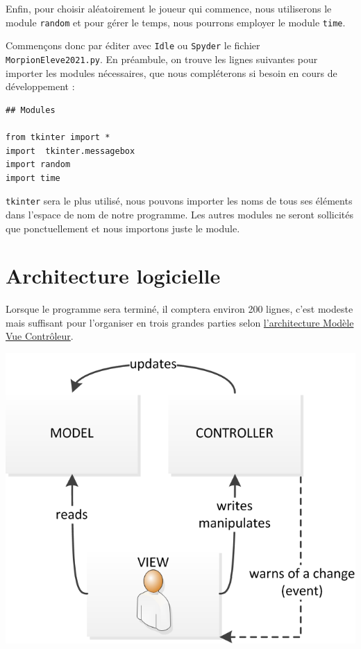 \documentclass[a4paper, french, 12pt]{article}  %
\begin{document}
Enfin, pour choisir  aléatoirement le joueur qui commence, nous utiliserons le module \lstinline+random+ et pour gérer le temps, nous pourrons employer le module \lstinline+time+.

Commençons donc par éditer avec \texttt{Idle} ou \texttt{Spyder} le fichier  \texttt{MorpionEleve2021.py}. En préambule, on trouve les lignes suivantes pour importer les modules nécessaires, que nous compléterons si besoin en cours de développement :

\begin{lstlisting}
## Modules

from tkinter import *
import  tkinter.messagebox 
import random
import time
\end{lstlisting}

\lstinline+tkinter+ sera le plus utilisé, nous pouvons importer les noms de tous  ses éléments  dans l'espace de nom de notre programme. Les  autres modules ne seront sollicités que ponctuellement et nous  importons juste le module.



\section{Architecture logicielle}


Lorsque le programme sera terminé, il comptera environ 200 lignes, c'est modeste mais suffisant pour l'organiser en trois grandes parties selon \href{https://fr.wikipedia.org/wiki/Mod\%C3\%A8le-vue-contr\%C3\%B4leur}{l'architecture Modèle Vue Contrôleur}.

\begin{center}
\includegraphics[scale=0.8]{graphiques/ModeleMVC.png}
\end{center}
\end{document}
